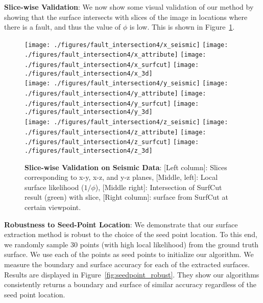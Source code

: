 \documentclass[10pt,journal,compsoc]{IEEEtran}
\begin{document}
{\bf Slice-wise Validation}: We now show some visual validation of our
method by showing that the surface intersects with slices of the image
in locations where there is a fault, and thus the value of $\phi$ is
low. This is shown in Figure~\ref{fig:fault-intersection4}.

\def\fHeightFIaa{0.83in}
\def\fHeightFIbb{0.83in}
\def\fHeightFIcc{0.83in}
\begin{figure}
  \centering
  \texttt{[image: ./figures/fault\_intersection4/x\_seismic]}
  \texttt{[image: ./figures/fault\_intersection4/x\_attribute]}
  \texttt{[image: ./figures/fault\_intersection4/x\_surfcut]}
  \texttt{[image: ./figures/fault\_intersection4/x\_3d]}  \\ \vspace{1mm}
  \texttt{[image: ./figures/fault\_intersection4/y\_seismic]}
  \texttt{[image: ./figures/fault\_intersection4/y\_attribute]}
  \texttt{[image: ./figures/fault\_intersection4/y\_surfcut]}
  \texttt{[image: ./figures/fault\_intersection4/y\_3d]}  \\ \vspace{1mm}
  \texttt{[image: ./figures/fault\_intersection4/z\_seismic]}
  \texttt{[image: ./figures/fault\_intersection4/z\_attribute]}
  \texttt{[image: ./figures/fault\_intersection4/z\_surfcut]}
  \texttt{[image: ./figures/fault\_intersection4/z\_3d]}  \\ \vspace{1mm}
  \caption{{\bf Slice-wise Validation on Seismic Data}: [Left column]:
    Slices corresponding to x-y, x-z, and y-z planes, [Middle, left]:
    Local surface likelihood ($1/\phi$), [Middle right]: Intersection
    of SurfCut result (green) with slice, [Right column]: surface from
    SurfCut at certain viewpoint.}
  \label{fig:fault-intersection4}
\end{figure}

{\bf Robustness to Seed-Point Location}: We demonstrate that our
surface extraction method is robust to the choice of the seed point
location. To this end, we randomly sample 30 points (with high local
likelihood) from the ground truth surface. We use each of the points
as seed points to initialize our algorithm. We measure the boundary
and surface accuracy for each of the extracted surfaces. Results are
displayed in Figure~\ref{fig:seedpoint_robust}. They show our
algorithms consistently returns a boundary and surface of similar
accuracy regardless of the seed point location.
\end{document}

